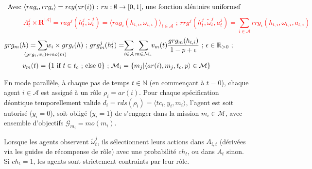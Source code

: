 \begin{figure}[h!]
\begin{scriptsize}
    \textcolor{red}{\[\hspace{-1cm}\text{ \hspace{-0.1cm} Avec } \langle rag_i, rrg_i \rangle = rcg(ar(i)) \text{ ; } rn: \emptyset \to [0,1[ \text{, une fonction aléatoire uniformef}\]}
    \vspace{-0.3cm}
    \textcolor{red}{\[A^j_t \times \mathbf{R}^{|\mathcal{A}|} = rag^j(h^j_t, \tilde{\omega}^j_t) = \langle rag_i(h_{t,i}, \omega_{t,i}) \rangle_{i \in \mathcal{A}} \text{ ; } rrg^j(h^j_t, \tilde{\omega}^j_t, a^j_t) = \sum_{i \in \mathcal{A}}{rrg_i(h_{t,i}, \omega_{t,i}, a_{t,i})}\]}
    \vspace{-0.75cm}
    \textcolor{blue}{
      \begin{gather*}
        \hspace{-1cm} grg_m(h) = \hspace{-1cm} \sum_{\hspace{0.3cm}(grg_i,w_i) \in mo(m)}{\hspace{-1.1cm} w_i \times grg_i(h)}
        \text{ ; }
        grg^j_m(h^j_t) = \hspace{-0.1cm} \sum_{i \in \mathcal{A}}{\sum_{m \in \mathcal{M}_i}{ \hspace{-0.1cm} v_m(t) \frac{grg_m(h_{t,i})}{1 - p + \epsilon} }} \text{ ; } \epsilon \in \mathbb{R}_{>0} \text{ ; }
      \end{gather*}
    }
    \vspace{-0.9cm}
    \textcolor{blue}{
      \begin{gather*}
        \hspace{-1cm}
        v_m(t) = \{ 1 \text{ if } t \in t_c \text{ ; else } 0 \} \text{ ; } \mathcal{M}_i = \{m_j | \langle ar(i),m_j,t_c,p \rangle \in \mathcal{M}\}
      \end{gather*}
    }
  \end{scriptsize}

\end{figure}

\noindent En mode parallèle, à chaque pas de temps $t \in \mathbb{N}$ (en commençant à $t=0$), chaque agent $i \in \mathcal{A}$ est assigné à un rôle $\rho_i = ar(i)$. Pour chaque spécification déontique temporellement valide $d_i = rds(\rho_i) = \langle tc_i, y_i, m_i \rangle$, l'agent est soit autorisé ($y_i = 0$), soit obligé ($y_i = 1$) de s'engager dans la mission $m_i \in \mathcal{M}$, avec ensemble d'objectifs $\mathcal{G}_{m_i} = mo(m_i)$.

Lorsque les agents observent $\tilde{\omega}_t^j$, ils sélectionnent leurs actions dans $A_{i,t}$ (dérivées via les guides de récompense de rôle) avec une probabilité $ch_t$, ou dans $A_t$ sinon. Si $ch_t = 1$, les agents sont strictement contraints par leur rôle.

